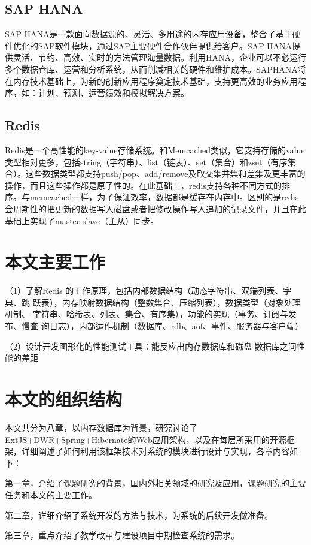\documentclass{zjutthesis}
\begin{document}
\subsection{SAP HANA}
SAP HANA是一款面向数据源的、灵活、多用途的内存应用设备，整合了基于硬件优化的SAP软件模块，通过SAP主要硬件合作伙伴提供给客户。SAP HANA提供灵活、节约、高效、实时的方法管理海量数据。利用HANA，企业可以不必运行多个数据仓库、运营和分析系统，从而削减相关的硬件和维护成本。SAPHANA将在内存技术基础上，为新的创新应用程序奠定技术基础，支持更高效的业务应用程序，如：计划、预测、运营绩效和模拟解决方案。

\subsection{Redis}
Redis是一个高性能的key-value存储系统。和Memcached类似，它支持存储的value类型相对更多，包括string（字符串）、list（链表）、set（集合）和zset（有序集合）。这些数据类型都支持push/pop、add/remove及取交集并集和差集及更丰富的操作，而且这些操作都是原子性的。在此基础上，redis支持各种不同方式的排序。与memcached一样，为了保证效率，数据都是缓存在内存中。区别的是redis会周期性的把更新的数据写入磁盘或者把修改操作写入追加的记录文件，并且在此基础上实现了master-slave（主从）同步。

\section{本文主要工作}
（1）了解Redis 的工作原理，包括内部数据结构（动态字符串、双端列表、字典、跳
跃表），内存映射数据结构（整数集合、压缩列表），数据类型（对象处理机制、
字符串、哈希表、列表、集合、有序集），功能的实现（事务、订阅与发布、慢查
询日志），内部运作机制（数据库、rdb、aof、事件、服务器与客户端）

（2）设计开发图形化的性能测试工具：能反应出内存数据库和磁盘
数据库之间性能的差距

\section{本文的组织结构}
本文共分为八章，以内存数据库为背景，研究讨论了ExtJS+DWR+Spring+Hibernate的Web应用架构，以及在每层所采用的开源框架，详细阐述了如何利用该框架技术对系统的模块进行设计与实现，各章内容如下：

第一章，介绍了课题研究的背景，国内外相关领域的研究及应用，课题研究的主要任务和本文的主要工作。

第二章，详细介绍了系统开发的方法与技术，为系统的后续开发做准备。

第三章，重点介绍了教学改革与建设项目中期检查系统的需求。
\end{document}
